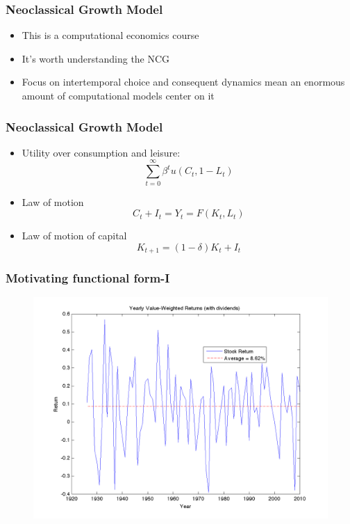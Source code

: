 \documentclass{beamer}
\begin{document}
\begin{frame}
\frametitle[alignment=center]{Neoclassical Growth Model}
\begin{itemize}
\item This is a computational economics course
\bigskip
\item It's worth understanding the NCG
\bigskip
\item Focus on intertemporal choice and consequent dynamics mean an enormous amount of computational models center on it
\end{itemize}
\end{frame}

\begin{frame}
\frametitle[alignment=center]{Neoclassical Growth Model}
\begin{itemize}
\item Utility over consumption and leisure:
$$\sum_{t=0}^\infty \beta^tu(C_t,1-L_t)$$
\item Law of motion
$$C_t+I_t=Y_t=F(K_t,L_t)$$
\item Law of motion of capital
$$K_{t+1}=(1-\delta)K_t+I_t$$
\end{itemize}
\end{frame}

\begin{frame}
\frametitle[alignment=center]{Motivating functional form-I}
\begin{figure}
\centering
\includegraphics[scale=0.2]{AnnualReturns}
\end{figure}
\end{frame}
\end{document}

